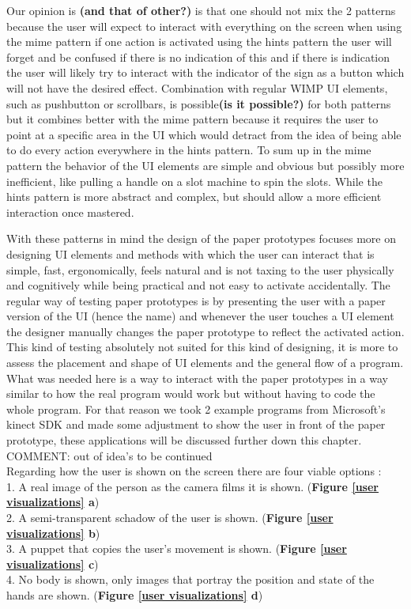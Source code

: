 Our opinion is \textbf{(and that of other?)} is that one should not mix the 2 patterns because the user will expect to interact with everything on the screen when using the mime pattern if one action is activated using the hints pattern the user will forget and be confused if there is no indication of this and if there is indication the user will likely try to interact with the indicator of the sign as a button which will not have the desired effect. Combination with regular WIMP UI elements, such as pushbutton or scrollbars, is possible\textbf{(is it possible?)} for both patterns but it combines better with the mime pattern because it requires the user to point at a specific area in the UI which would detract from the idea of being able to do every action everywhere in the hints pattern. To sum up in the mime pattern the behavior of the UI elements are simple and obvious but possibly more inefficient, like pulling a handle on a slot machine to spin the slots. While the hints pattern is more abstract and complex, but should allow a more efficient interaction once mastered.

With these patterns in mind the design of the paper prototypes focuses more on designing UI elements and methods with which the user can interact that is simple, fast, ergonomically, feels natural and is not taxing to the user physically and cognitively while being practical and not easy to activate accidentally. The regular way of testing paper prototypes is by presenting the user with a paper version of the UI (hence the name) and whenever the user touches a UI element the designer manually changes the paper prototype to reflect the activated action. This kind of testing absolutely not suited for this kind of designing, it is more to assess the placement and shape of UI elements and the general flow of a program. What was needed here is a way to interact with the paper prototypes in a way similar to how the real program would work but without having to code the whole program. For that reason we took 2 example programs from Microsoft's kinect SDK and made some adjustment to show the user in front of the paper prototype, these applications will be discussed further down this chapter. \\
{\large COMMENT: out of idea's to be continued }\\
 
 Regarding how the user is shown on the screen there are four viable options : \\
 1. A real image of the person as the camera films it is shown.   (\textbf{Figure \ref{user visualizations} a}) \\
 2. A semi-transparent schadow of the user is shown. (\textbf{Figure \ref{user visualizations} b}) \\
 3. A puppet that copies the user's movement is shown.  (\textbf{Figure \ref{user visualizations} c}) \\
 4. No body is shown, only images that portray the position and state of the hands are shown. (\textbf{Figure \ref{user visualizations} d}) \\ \\
 
